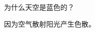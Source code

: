 \documentclass[answer,fontset=windows]{exam}
\begin{document}
\begin{questions}
    \question[10] 为什么天空是蓝色的？
    \begin{solution}
        因为空气散射阳光产生色散。
    \end{solution}

\end{questions}
\end{document}
